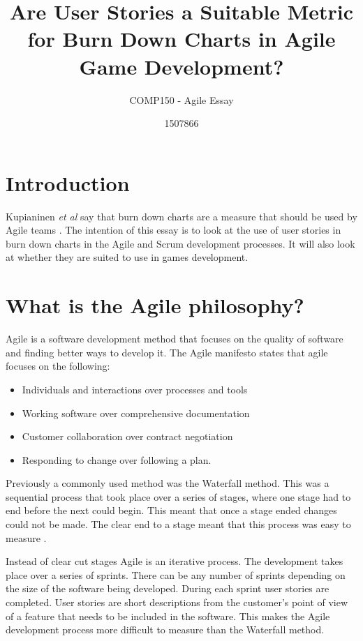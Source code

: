 \documentclass{scrartcl}
\title{Are User Stories a Suitable Metric for Burn Down Charts in Agile Game Development?}
\subtitle{COMP150 - Agile Essay}
\author{1507866}
\begin{document}
	
\maketitle
	
	
\section{Introduction}

Kupianinen \textit{et al} say that burn down charts are a measure that should be used by Agile teams \cite{Kupiainen}. The intention of this essay is to look at the use of user stories in burn down charts in the Agile and Scrum development processes. It will also look at whether they are suited to use in games development.

\section{What is the Agile philosophy?}

Agile is a software development method that focuses on the quality of software and finding better ways to develop it. The Agile manifesto states that agile focuses on the following:

\begin{itemize}
	\item Individuals and interactions over processes and tools
	\item Working software over comprehensive documentation
	\item Customer collaboration over contract negotiation
	\item Responding to change over following a plan. \cite{AgileManifesto}  
\end{itemize} 

Previously a commonly used method was the Waterfall method. This was a sequential process that took place over a series of stages, where one stage had to end before the next could begin. This meant that once a stage ended changes could not be made. The clear end to a stage meant that this process was easy to measure \cite{Duka}.

Instead of clear cut stages Agile is an iterative process. The development takes place over a series of sprints. There can be any number of sprints depending on the size of the software being developed.  During each sprint user stories are completed. User stories are short descriptions from the customer's point of view of a feature that needs to be included in the software. This makes the Agile development process more difficult to measure than the Waterfall method.%
\end{document}
